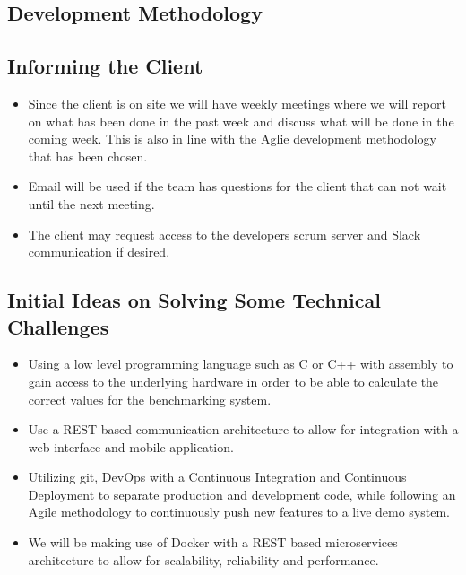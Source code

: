 \subsection{Development Methodology}


\subsection{Informing the Client}
\begin{itemize}
	\item Since the client is on site we will have weekly meetings where we will report on what has been done in the past week and discuss what will be done in the coming week. This is also in line with the Aglie development methodology that has been chosen.
	\item Email will be used if the team has questions for the client that can not wait until the next meeting.
	\item The client may request access to the developers scrum server and Slack communication if desired.
\end{itemize}

\subsection{Initial Ideas on Solving Some Technical Challenges}
\begin{itemize}
	\item Using a low level programming language such as C or C++ with assembly to gain access to the underlying hardware in order to be able to calculate the correct values for the benchmarking system.
	\item Use a REST based communication architecture to allow for integration with a web interface and mobile application.
	\item Utilizing git, DevOps with a Continuous Integration and Continuous Deployment to separate production and development code, while following an Agile methodology to continuously push new features to a live demo system.
	\item We will be making use of Docker with a REST based microservices architecture to allow for scalability, reliability and performance.
\end{itemize}

